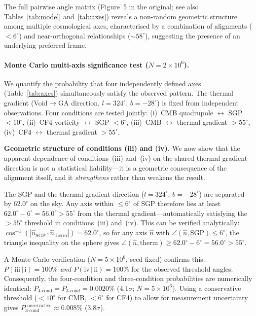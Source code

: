 \documentclass[12pt]{article}
\begin{document}
The full pairwise angle matrix (Figure~5 in the original; see also Tables~\ref{tab:model} and~\ref{tab:axes}) reveals a non-random geometric
structure among multiple cosmological axes, characterised by a combination of
alignments ($<6^\circ$) and near-orthogonal relationships ($\sim58^\circ$),
suggesting the presence of an underlying preferred frame.

\paragraph{Monte Carlo multi-axis significance test ($N=2\times10^6$).}
We quantify the probability that four independently defined axes (Table~\ref{tab:axes})
simultaneously satisfy the observed pattern.
The thermal gradient (Void$\to$GA direction, $l=324^\circ$, $b=-28^\circ$) is
fixed from independent observations. Four conditions are tested jointly:
(i)~CMB quadrupole $\leftrightarrow$ SGP $<10^\circ$,
(ii)~CF4 vorticity $\leftrightarrow$ SGP $<6^\circ$,
(iii)~CMB $\leftrightarrow$ thermal gradient $>55^\circ$,
(iv)~CF4 $\leftrightarrow$ thermal gradient $>55^\circ$.

\textbf{Geometric structure of conditions (iii) and (iv).}
We now show that the apparent dependence of conditions~(iii) and~(iv) on the
shared thermal gradient direction is not a statistical liability---it is a
geometric consequence of the alignment itself, and it \emph{strengthens}
rather than weakens the result.

The SGP and the thermal gradient direction ($l=324^\circ$, $b=-28^\circ$)
are separated by $62.0^\circ$ on the sky. Any axis within $\leq6^\circ$ of
SGP therefore lies at least $62.0^\circ - 6^\circ = 56.0^\circ > 55^\circ$
from the thermal gradient---automatically satisfying the $>55^\circ$ threshold
in conditions~(iii) and~(iv). This can be verified analytically:
$\cos^{-1}(|\hat{n}_\mathrm{SGP}\cdot\hat{n}_\mathrm{therm}|) = 62.0^\circ$,
so for any axis $\hat{n}$ with $\angle(\hat{n}, \mathrm{SGP}) \leq 6^\circ$,
the triangle inequality on the sphere gives
$\angle(\hat{n}, \mathrm{therm}) \geq 62.0^\circ - 6^\circ = 56.0^\circ > 55^\circ$.

A Monte Carlo verification ($N = 5\times10^6$, seed fixed) confirms this:
\emph{$P(\mathrm{iii}\,|\,\mathrm{i}) = 100\%$ and
$P(\mathrm{iv}\,|\,\mathrm{ii}) = 100\%$} for the observed threshold angles.
Consequently, the four-condition and three-condition probabilities are
numerically identical:
$P_\mathrm{4\text{-}cond} = P_\mathrm{3\text{-}cond} = 0.0020\%$
($4.1\sigma$; $N=5\times10^6$).
Using a conservative threshold ($<10^\circ$ for CMB, $<6^\circ$ for CF4)
to allow for measurement uncertainty gives
$P_\mathrm{3\text{-}cond}^\mathrm{conservative} \approx 0.008\%$ ($3.8\sigma$).
\end{document}

